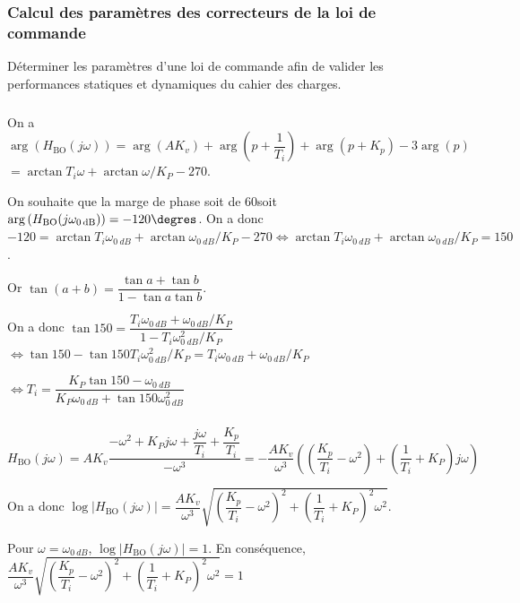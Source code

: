 \documentclass[10pt,fleqn]{article} %
\begin{document}
\subsubsection{Calcul des paramètres des correcteurs de la loi de commande}

\begin{obj}
Déterminer les paramètres d’une loi de commande afin de valider les performances statiques et dynamiques du cahier des charges.
\end{obj}

\subparagraph{}
On a $\arg \left(H_{\text{BO}}(j\omega)\right)=\arg\left(AK_v \right) + \arg\left(p+\dfrac{1}{T_i}\right) + \arg\left(p+K_p\right)-3 \arg(p)$
$ =\arctan T_i\omega +\arctan\omega/K_P -270$.

On souhaite que la marge de phase soit de 60\degres soit 
$\arg \left(H_{\text{BO}}(j\omega_{\SI{0}{dB}})\right)=-120\degres$. 
On a donc 
$-120=\arctan T_i\omega_{\SI{0}{dB}} +\arctan\omega_{\SI{0}{dB}}/K_P -270 \Leftrightarrow \arctan T_i\omega_{\SI{0}{dB}} +\arctan\omega_{\SI{0}{dB}}/K_P = 150$.

Or $\tan(a+b)=\dfrac{\tan a + \tan b}{1-\tan a\tan b}$. 

On a donc $\tan 150 = \dfrac{T_i\omega_{\SI{0}{dB}} + \omega_{\SI{0}{dB}}/K_P}{1-T_i\omega_{\SI{0}{dB}}^2/K_P}$
$ \Leftrightarrow \tan 150 -\tan 150 T_i\omega_{\SI{0}{dB}}^2/K_P= T_i\omega_{\SI{0}{dB}} + \omega_{\SI{0}{dB}}/K_P $

$ \Leftrightarrow  T_i  = \dfrac{K_P\tan 150 - \omega_{\SI{0}{dB}}}{K_P\omega_{\SI{0}{dB}}+\tan 150 \omega_{\SI{0}{dB}}^2}$


\subparagraph{}

$H_{\text{BO}}(j\omega)=AK_v\dfrac{-\omega^2 + K_Pj\omega + \dfrac{j\omega}{T_i}+\dfrac{K_p}{T_i }}{-\omega^3}
=-\dfrac{AK_v}{\omega^3}  \left(\left(\dfrac{K_p}{T_i }-\omega^2 \right)+\left(\dfrac{1}{T_i}+ K_P\right)j\omega \right)$

On a donc 
$\log\left|H_{\text{BO}}(j\omega)\right|=\dfrac{AK_v}{\omega^3}  \sqrt{\left(\dfrac{K_p}{T_i }-\omega^2 \right)^2+\left(\dfrac{1}{T_i}+ K_P\right)^2\omega^2}$. 

Pour $\omega=\omega_{\SI{0}{dB}}$, $\log\left|H_{\text{BO}}(j\omega)\right|=1$. En conséquence, 
$\dfrac{AK_v}{\omega^3}  \sqrt{\left(\dfrac{K_p}{T_i }-\omega^2 \right)^2+\left(\dfrac{1}{T_i}+ K_P\right)^2\omega^2}=1 $
\end{document}
